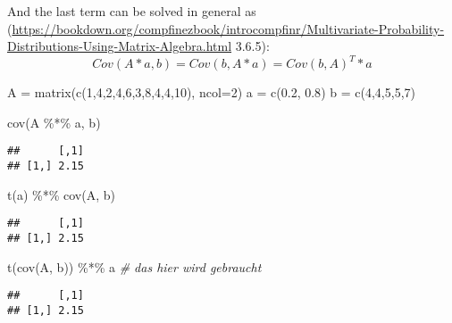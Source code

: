 \documentclass[
  oneside]{book}
\newenvironment{Shaded}{\begin{snugshade}}{\end{snugshade}}
\newcommand{\AttributeTok}[1]{\textcolor[rgb]{0.77,0.63,0.00}{#1}}
\newcommand{\CommentTok}[1]{\textcolor[rgb]{0.56,0.35,0.01}{\textit{#1}}}
\newcommand{\DecValTok}[1]{\textcolor[rgb]{0.00,0.00,0.81}{#1}}
\newcommand{\FloatTok}[1]{\textcolor[rgb]{0.00,0.00,0.81}{#1}}
\newcommand{\FunctionTok}[1]{\textcolor[rgb]{0.00,0.00,0.00}{#1}}
\newcommand{\NormalTok}[1]{#1}
\newcommand{\OtherTok}[1]{\textcolor[rgb]{0.56,0.35,0.01}{#1}}
\newcommand{\SpecialCharTok}[1]{\textcolor[rgb]{0.00,0.00,0.00}{#1}}
\begin{document}
And the last term can be solved in general as (\url{https://bookdown.org/compfinezbook/introcompfinr/Multivariate-Probability-Distributions-Using-Matrix-Algebra.html} 3.6.5):
\[
  Cov(A*a, b) = Cov(b, A*a) = Cov(b, A)^T * a
\]

\begin{Shaded}
\begin{Highlighting}[]
\NormalTok{A }\OtherTok{=} \FunctionTok{matrix}\NormalTok{(}\FunctionTok{c}\NormalTok{(}\DecValTok{1}\NormalTok{,}\DecValTok{4}\NormalTok{,}\DecValTok{2}\NormalTok{,}\DecValTok{4}\NormalTok{,}\DecValTok{6}\NormalTok{,}\DecValTok{3}\NormalTok{,}\DecValTok{8}\NormalTok{,}\DecValTok{4}\NormalTok{,}\DecValTok{4}\NormalTok{,}\DecValTok{10}\NormalTok{), }\AttributeTok{ncol=}\DecValTok{2}\NormalTok{)}
\NormalTok{a }\OtherTok{=} \FunctionTok{c}\NormalTok{(}\FloatTok{0.2}\NormalTok{, }\FloatTok{0.8}\NormalTok{)}
\NormalTok{b }\OtherTok{=} \FunctionTok{c}\NormalTok{(}\DecValTok{4}\NormalTok{,}\DecValTok{4}\NormalTok{,}\DecValTok{5}\NormalTok{,}\DecValTok{5}\NormalTok{,}\DecValTok{7}\NormalTok{)}

\FunctionTok{cov}\NormalTok{(A }\SpecialCharTok{\%*\%}\NormalTok{ a, b)}
\end{Highlighting}
\end{Shaded}

\begin{verbatim}
##      [,1]
## [1,] 2.15
\end{verbatim}

\begin{Shaded}
\begin{Highlighting}[]
\FunctionTok{t}\NormalTok{(a) }\SpecialCharTok{\%*\%} \FunctionTok{cov}\NormalTok{(A, b)}
\end{Highlighting}
\end{Shaded}

\begin{verbatim}
##      [,1]
## [1,] 2.15
\end{verbatim}

\begin{Shaded}
\begin{Highlighting}[]
\FunctionTok{t}\NormalTok{(}\FunctionTok{cov}\NormalTok{(A, b)) }\SpecialCharTok{\%*\%}\NormalTok{ a }\CommentTok{\# das hier wird gebraucht}
\end{Highlighting}
\end{Shaded}

\begin{verbatim}
##      [,1]
## [1,] 2.15
\end{verbatim}
\end{document}
